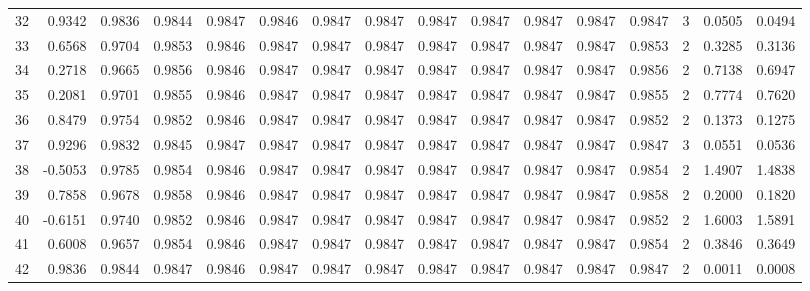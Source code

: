 \begin{tabular}{lrrrrrrrrrrrrrrr}
32  &      0.9342 &  0.9836 &  0.9844 &  0.9847 &  0.9846 &  0.9847 &  0.9847 &  0.9847 &  0.9847 &  0.9847 &   0.9847 &     0.9847 &      3 &                    0.0505 &                     0.0494 \\
33  &      0.6568 &  0.9704 &  0.9853 &  0.9846 &  0.9847 &  0.9847 &  0.9847 &  0.9847 &  0.9847 &  0.9847 &   0.9847 &     0.9853 &      2 &                    0.3285 &                     0.3136 \\
34  &      0.2718 &  0.9665 &  0.9856 &  0.9846 &  0.9847 &  0.9847 &  0.9847 &  0.9847 &  0.9847 &  0.9847 &   0.9847 &     0.9856 &      2 &                    0.7138 &                     0.6947 \\
35  &      0.2081 &  0.9701 &  0.9855 &  0.9846 &  0.9847 &  0.9847 &  0.9847 &  0.9847 &  0.9847 &  0.9847 &   0.9847 &     0.9855 &      2 &                    0.7774 &                     0.7620 \\
36  &      0.8479 &  0.9754 &  0.9852 &  0.9846 &  0.9847 &  0.9847 &  0.9847 &  0.9847 &  0.9847 &  0.9847 &   0.9847 &     0.9852 &      2 &                    0.1373 &                     0.1275 \\
37  &      0.9296 &  0.9832 &  0.9845 &  0.9847 &  0.9847 &  0.9847 &  0.9847 &  0.9847 &  0.9847 &  0.9847 &   0.9847 &     0.9847 &      3 &                    0.0551 &                     0.0536 \\
38  &     -0.5053 &  0.9785 &  0.9854 &  0.9846 &  0.9847 &  0.9847 &  0.9847 &  0.9847 &  0.9847 &  0.9847 &   0.9847 &     0.9854 &      2 &                    1.4907 &                     1.4838 \\
39  &      0.7858 &  0.9678 &  0.9858 &  0.9846 &  0.9847 &  0.9847 &  0.9847 &  0.9847 &  0.9847 &  0.9847 &   0.9847 &     0.9858 &      2 &                    0.2000 &                     0.1820 \\
40  &     -0.6151 &  0.9740 &  0.9852 &  0.9846 &  0.9847 &  0.9847 &  0.9847 &  0.9847 &  0.9847 &  0.9847 &   0.9847 &     0.9852 &      2 &                    1.6003 &                     1.5891 \\
41  &      0.6008 &  0.9657 &  0.9854 &  0.9846 &  0.9847 &  0.9847 &  0.9847 &  0.9847 &  0.9847 &  0.9847 &   0.9847 &     0.9854 &      2 &                    0.3846 &                     0.3649 \\
42  &      0.9836 &  0.9844 &  0.9847 &  0.9846 &  0.9847 &  0.9847 &  0.9847 &  0.9847 &  0.9847 &  0.9847 &   0.9847 &     0.9847 &      2 &                    0.0011 &                     0.0008 \\

\end{tabular}
